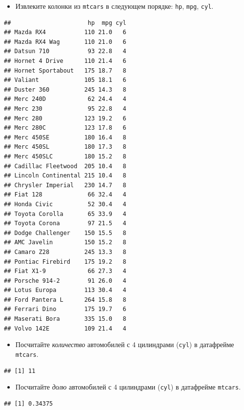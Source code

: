 \documentclass[]{book}
\providecommand{\tightlist}{%
  \setlength{\itemsep}{0pt}\setlength{\parskip}{0pt}}
\begin{document}
\begin{itemize}
\tightlist
\item
  Извлеките колонки из \texttt{mtcars} в следующем порядке: \texttt{hp},
  \texttt{mpg}, \texttt{cyl}.
\end{itemize}

\begin{verbatim}
##                      hp  mpg cyl
## Mazda RX4           110 21.0   6
## Mazda RX4 Wag       110 21.0   6
## Datsun 710           93 22.8   4
## Hornet 4 Drive      110 21.4   6
## Hornet Sportabout   175 18.7   8
## Valiant             105 18.1   6
## Duster 360          245 14.3   8
## Merc 240D            62 24.4   4
## Merc 230             95 22.8   4
## Merc 280            123 19.2   6
## Merc 280C           123 17.8   6
## Merc 450SE          180 16.4   8
## Merc 450SL          180 17.3   8
## Merc 450SLC         180 15.2   8
## Cadillac Fleetwood  205 10.4   8
## Lincoln Continental 215 10.4   8
## Chrysler Imperial   230 14.7   8
## Fiat 128             66 32.4   4
## Honda Civic          52 30.4   4
## Toyota Corolla       65 33.9   4
## Toyota Corona        97 21.5   4
## Dodge Challenger    150 15.5   8
## AMC Javelin         150 15.2   8
## Camaro Z28          245 13.3   8
## Pontiac Firebird    175 19.2   8
## Fiat X1-9            66 27.3   4
## Porsche 914-2        91 26.0   4
## Lotus Europa        113 30.4   4
## Ford Pantera L      264 15.8   8
## Ferrari Dino        175 19.7   6
## Maserati Bora       335 15.0   8
## Volvo 142E          109 21.4   4
\end{verbatim}

\begin{itemize}
\tightlist
\item
  Посчитайте \emph{количество} автомобилей с 4 цилиндрами (\texttt{cyl})
  в датафрейме \texttt{mtcars}.
\end{itemize}

\begin{verbatim}
## [1] 11
\end{verbatim}

\begin{itemize}
\tightlist
\item
  Посчитайте \emph{долю} автомобилей с 4 цилиндрами (\texttt{cyl}) в
  датафрейме \texttt{mtcars}.
\end{itemize}

\begin{verbatim}
## [1] 0.34375
\end{verbatim}
\end{document}
